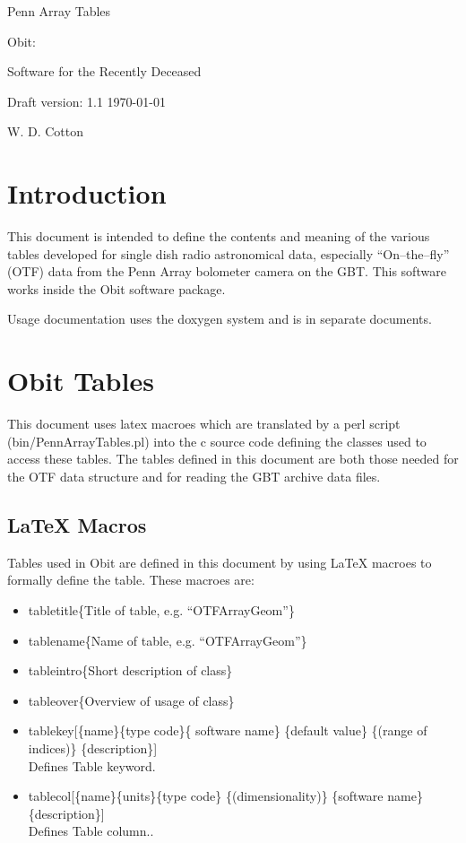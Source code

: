 \documentclass[11pt]{article}
\begin{document}
\setcounter{section}{0}

\vskip 5cm
\centerline{\ttlfont Penn Array Tables}
\vskip 1cm
\centerline{\ttlfont Obit: }
\centerline{\ttlfont Software for the Recently Deceased}
\vskip 3cm
\centerline{\secfont Draft version: 1.1 \today}
\vskip 1cm
\centerline{\secfont W. D. Cotton}
\clearpage

\tableofcontents
\cleardoublepage

\section {Introduction}
   This document is intended to define the contents and meaning of the
various tables developed for single dish radio astronomical data,
especially ``On--the--fly'' (OTF) data from the Penn Array bolometer
camera on the GBT.
This software works inside the Obit software package.

Usage documentation uses the doxygen system and is in separate
documents.

\section{Obit Tables}
This document uses latex macroes which are translated by a perl
script (bin/PennArrayTables.pl) into the c source code defining the
classes used to access these tables.
The tables defined in this document are both those needed for the OTF
data structure and for reading the GBT archive data files.

\subsection{LaTeX Macros}
Tables used in Obit are defined in this document by using LaTeX
macroes to formally define the table.
These macroes are:
\begin{itemize}
\item tabletitle\{Title of table, e.g. ``OTFArrayGeom''\}
\item tablename\{Name of table, e.g. ``OTFArrayGeom''\}
\item tableintro\{Short description of class\}
\item tableover\{Overview of usage of class\}
\item tablekey[\{name\}\{type code\}\{ software name\} \{default value\}
\{(range of indices)\} \{description\}]\\
Defines Table keyword.
\item tablecol[\{name\}\{units\}\{type code\} \{(dimensionality)\} \{software
name\} \{description\}]\\
Defines Table column..
\end{itemize}
\end{document}
